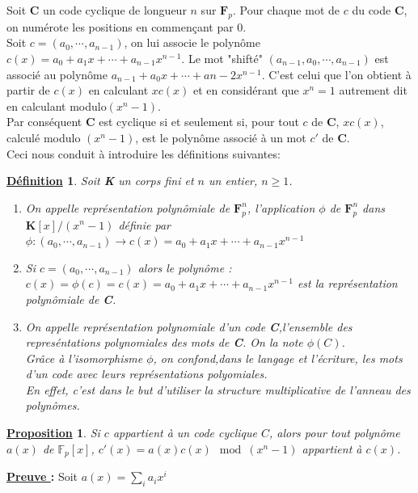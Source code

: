 \documentclass[12pt,openany]{report}
\newtheorem{proposition}{\underline{Proposition}}
\newtheorem{definition}{\underline{Définition}}
\begin{document}
Soit \textbf{C} un code cyclique de longueur $n$ sur $ \mathbf{F}_p$. Pour chaque mot de $c$ du code \textbf{C}, on numérote les positions en commençant par $0$.\\
Soit $c=(a_0,\cdots,a_{n-1})$, on lui associe le polynôme $c(x)=a_0+a_1x+\cdots+a_{n-1}x^{n-1}$. Le mot "shifté" $(a_{n-1},a_0,\cdots,a_{n-1})$ est associé au polynôme $a_{n-1}+a_0x+\cdots+a{n-2}x^{n-1}$. C'est celui que l'on obtient à partir de $c(x)$ en calculant $xc(x)$ et en considérant que $x^n=1$ autrement dit en calculant modulo$(x^n-1)$.\\
Par conséquent \textbf{C} est cyclique si et seulement si, pour tout $c$ de \textbf{C}, $xc(x)$, calculé modulo $(x^n-1)$, est le polynôme associé à un mot $c'$ de \textbf{C}.\\
Ceci nous conduit à introduire les définitions suivantes:\\
\begin{definition}
Soit \textbf{K} un corps fini et $n$ un entier, $n \geq 1$.
\begin{enumerate}
\item On appelle représentation polynômiale de $\mathbf{F}^n_p$, l'application $\phi$ de  $\mathbf{F}^n_p $ dans $\textbf{K}[x]/(x^n-1)
 $ définie par $ \phi : (a_0,\cdots,a_{n-1})\rightarrow c(x)= a_0+a_1x+\cdots+a_{n-1}x^{n-1}$
 \item Si $c=(a_0,\cdots,a_{n-1})$ alors le polynôme :\\
 $c(x)=\phi(c)=c(x)=a_0+a_1x+\cdots+a_{n-1}x^{n-1}$ est la représentation polynômiale de \textbf{C}.
 \item On appelle représentation polynomiale d'un code \textbf{C},\hspace{0.2cm}l'ensemble des represéntations polynomiales des mots de \textbf{C}. On la note $\phi(C)$.\\
 Grâce à l'isomorphisme $\phi$, on confond,dans le langage et l'écriture, les mots d'un code avec leurs représentations polyomiales. \\
 En effet, c'est dans le but d'utiliser la structure multiplicative de l'anneau des polynômes.
\end{enumerate}
\end{definition}

\begin{proposition}
Si $c$ appartient à un code cyclique $\mathit{C}$, alors pour tout polynôme $a(x)$ de $\mathbb{F}_p[x]$, $c'(x)=a(x)c(x)\mod(x^n-1) $ appartient à $c(x)$.
\end{proposition}
\textbf{\underline{Preuve }:}
Soit $a(x)=\sum_{i}a_ix^i$\\
\end{document}
